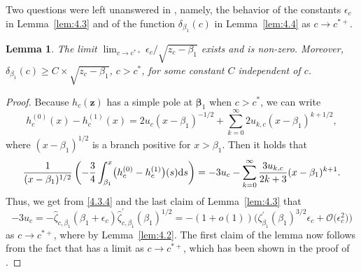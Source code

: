 \documentclass[pdftex]{sigma}
\numberwithin{equation}{section}
\newtheorem{Lemma}[Theorem]{Lemma}
\newcommand{\z}	{{\boldsymbol z}}
\begin{document}
Two questions were left unanswered in \cite[Section~7.4]{ApDenYa21}, namely, the behavior of the constants $ \epsilon_c $ in Lemma~\ref{lem:4.3} and of the function $ \delta_{\beta_1}(c) $ in Lemma~\ref{lem:4.4} as $ c\to c^{*+} $.

\begin{Lemma}
\label{lem:4.5}
The limit $ \lim_{c\to c^{*+}}\epsilon_c/\sqrt{z_c-\beta_1} $ exists and is non-zero. Moreover, $ \delta_{\beta_1}(c) \geq C\allowbreak\times\sqrt{z_c-\beta_1} $, $ c>c^* $, for some constant $ C $ independent of $ c $.
\end{Lemma}
\begin{proof}
Because $ h_c(\z) $ has a simple pole at $ \boldsymbol\beta_1 $ when $ c>c^* $, we can write
\[
h_c^{(0)}(x) - h_c^{(1)}(x) = 2u_c (x - \beta_1)^{-1/2} + \sum_{k=0}^\infty 2u_{k,c}(x - \beta_1)^{k+1/2},
\]
where $ (x-\beta_1)^{1/2} $ is a branch positive for $ x>\beta_1 $. Then it holds that
\[
\frac1{(x-\beta_1)^{1/2}} \left( -\frac34\int_{\beta_1}^x \bigl(h_c^{(0)}-h_c^{(1)}\bigr)(s) {\rm d}s \right) = -3u_c - \sum_{k=0}^\infty \frac{3u_{k,c}}{2k+3} (x-\beta_1)^{k+1}.
\]
Thus, we get from \eqref{4.3.4} and the last claim of Lemma~\ref{lem:4.3} that
\[
-3u_c = -\hat\zeta_{c,\beta_1}(\beta_1+\epsilon_c)\hat\zeta_{c,\beta_1}^\prime(\beta_1)^{1/2} = -(1+o(1)) \bigl(\zeta_{\beta_1}^\prime(\beta_1)^{3/2}\epsilon_c + \mathcal O\bigl(\epsilon_c^2\bigr) \bigr)
\]
as $ c\to c^{*+} $, where  by Lemma~\ref{lem:4.2}. The first claim of the lemma now follows from the fact that  has a limit as $ c\to c^{*+} $, which has been shown in the proof of \cite[Lemma~7.7]{ApDenYa21}.


\end{proof}
\end{document}
